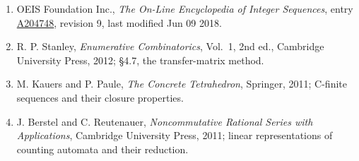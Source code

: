 \documentclass[11pt]{article}
\theoremstyle{definition}
\begin{document}
\begin{enumerate}

\item OEIS Foundation Inc., \emph{The On-Line Encyclopedia of Integer Sequences}, entry \href{https://oeis.org/A204748}{A204748}, revision 9, last modified Jun 09 2018.

\item R. P. Stanley, \emph{Enumerative Combinatorics}, Vol.~1, 2nd ed., Cambridge University Press, 2012; \S4.7, the transfer-matrix method.

\item M. Kauers and P. Paule, \emph{The Concrete Tetrahedron}, Springer, 2011; C-finite sequences and their closure properties.

\item J. Berstel and C. Reutenauer, \emph{Noncommutative Rational Series with Applications}, Cambridge University Press, 2011; linear representations of counting automata and their reduction.

\end{enumerate}
\end{document}
